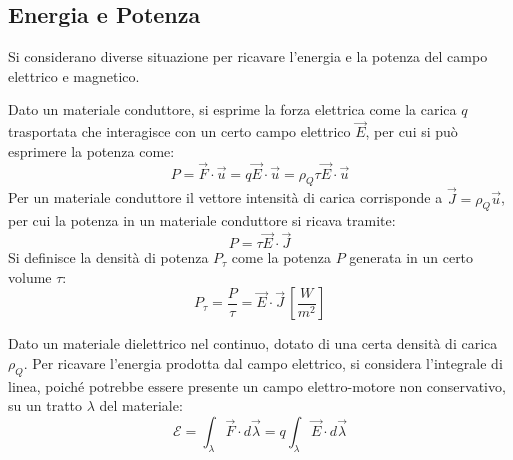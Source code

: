 \documentclass{article}
\numberwithin{equation}{subsection}
\begin{document}
\subsection{Energia e Potenza}

Si considerano diverse situazione per ricavare l'energia e la potenza del campo elettrico e magnetico.

Dato un materiale conduttore, si esprime la forza elettrica come la carica $q$ trasportata che interagisce con un certo campo elettrico $\vec{E}$, per cui si può esprimere 
la potenza come:
\begin{equation*}
    P=\vec{F}\cdot\vec{u}=q\vec{E}\cdot\vec{u}=\rho_Q\tau\vec{E}\cdot\vec{u}
\end{equation*}
Per un materiale conduttore il vettore intensità di carica corrisponde a $\vec{J}=\rho_Q\vec{u}$, per cui la potenza in un materiale conduttore si ricava tramite:
\begin{equation*}
    P=\tau\vec{E}\cdot\vec{J}
\end{equation*}
Si definisce la densità di potenza $P_\tau$ come la potenza $P$ generata in un certo volume $\tau$: 
\begin{equation}
    P_{\tau}=\displaystyle\frac{P}{\tau}=\vec{E}\cdot\vec{J}\,\left[\frac{W}{m^2}\right]
\end{equation}


Dato un materiale dielettrico nel continuo, dotato di una certa densità di carica $\rho_Q$. Per ricavare l'energia prodotta dal campo elettrico, si considera l'integrale 
di linea, poiché potrebbe essere presente un campo elettro-motore non conservativo, su un tratto $\lambda$ del materiale:
\begin{equation*}
    \mathscr{E}=\displaystyle\int_{\lambda}\vec{F}\cdot d\vec{\lambda}=q\int_{\lambda}\vec{E}\cdot d\vec{\lambda}
\end{equation*}

\begin{center}
\end{center}
\end{document}
